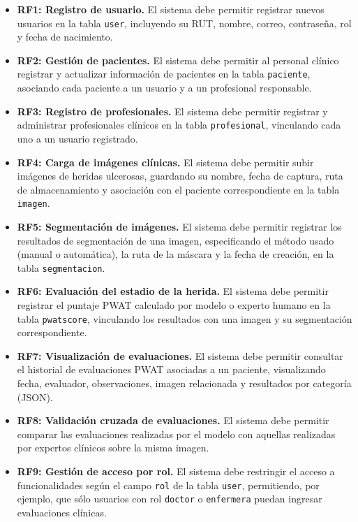 \begin{itemize}
    \item \textbf{RF1: Registro de usuario.} El sistema debe permitir registrar nuevos usuarios en la tabla \texttt{user}, incluyendo su RUT, nombre, correo, contraseña, rol y fecha de nacimiento.

    \item \textbf{RF2: Gestión de pacientes.} El sistema debe permitir al personal clínico registrar y actualizar información de pacientes en la tabla \texttt{paciente}, asociando cada paciente a un usuario y a un profesional responsable.

    \item \textbf{RF3: Registro de profesionales.} El sistema debe permitir registrar y administrar profesionales clínicos en la tabla \texttt{profesional}, vinculando cada uno a un usuario registrado.

    \item \textbf{RF4: Carga de imágenes clínicas.} El sistema debe permitir subir imágenes de heridas ulcerosas, guardando su nombre, fecha de captura, ruta de almacenamiento y asociación con el paciente correspondiente en la tabla \texttt{imagen}.

    \item \textbf{RF5: Segmentación de imágenes.} El sistema debe permitir registrar los resultados de segmentación de una imagen, especificando el método usado (manual o automática), la ruta de la máscara y la fecha de creación, en la tabla \texttt{segmentacion}.

    \item \textbf{RF6: Evaluación del estadio de la herida.} El sistema debe permitir registrar el puntaje PWAT calculado por modelo o experto humano en la tabla \texttt{pwatscore}, vinculando los resultados con una imagen y su segmentación correspondiente.

    \item \textbf{RF7: Visualización de evaluaciones.} El sistema debe permitir consultar el historial de evaluaciones PWAT asociadas a un paciente, visualizando fecha, evaluador, observaciones, imagen relacionada y resultados por categoría (JSON).

    \item \textbf{RF8: Validación cruzada de evaluaciones.} El sistema debe permitir comparar las evaluaciones realizadas por el modelo con aquellas realizadas por expertos clínicos sobre la misma imagen.

    \item \textbf{RF9: Gestión de acceso por rol.} El sistema debe restringir el acceso a funcionalidades según el campo \texttt{rol} de la tabla \texttt{user}, permitiendo, por ejemplo, que sólo usuarios con rol \texttt{doctor} o \texttt{enfermera} puedan ingresar evaluaciones clínicas.

\end{itemize}



